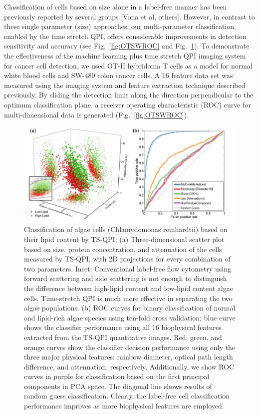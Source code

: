 \documentclass[aps,pra,reprint,superscriptaddress]{revtex4-1}
\begin{document}
Classification of cells based on size alone in a label-free manner has been previously reported by several groups [Vona et al, others]. However, in contrast to these single parameter (size) approaches, our multi-parameter classification, enabled by the time stretch QPI, offers considerable improvements in detection sensitivity and accuracy (see Fig.~\ref{fig:OTSWROC} and Fig.~\ref{fig:AlgaeScatter}). To demonstrate the effectiveness of the machine learning plus time stretch QPI imaging system for cancer cell detection, we used OT-II hybridoma T cells as a model for normal white blood cells and SW-480 colon cancer cells. A 16 feature data set was measured using the imaging system and feature extraction technique described previously. By sliding the detection limit along the direction perpendicular to the optimum classification plane, a receiver operating characteristic (ROC) curve for multi-dimensional data is generated (Fig.~\ref{fig:OTSWROC}).

\begin{figure}
\includegraphics[scale=0.5]{FigureAlgaeScatter.jpg}
\caption{\label{fig:AlgaeScatter} Classification of algae cells (Chlamydomonas reinhardtii) based on their lipid content by TS-QPI; (a) Three-dimensional scatter plot based on size, protein concentration, and attenuation of the cells measured by TS-QPI, with 2D projections for every combination of two parameters. Inset: Conventional label-free flow cytometry using forward scattering and side scattering is not enough to distinguish the difference between high-lipid content and low-lipid content algae cells. Time-stretch QPI is much more effective in separating the two algae populations. (b) ROC curves for binary classification of normal and lipid-rich algae species using ten-fold cross validation; blue curve shows the classifier performance using all 16 biophysical features extracted from the TS-QPI quantitative images. Red, green, and orange curves show the classifier decision performance using only the three major physical features: rainbow diameter, optical path length difference, and attenuation, respectively. Additionally, we show ROC curves in purple for classification based on the first principal components in PCA space. The diagonal line shows results of random guess classification. Clearly, the label-free cell classification performance improves as more biophysical features are employed.}
\end{figure}
\end{document}

